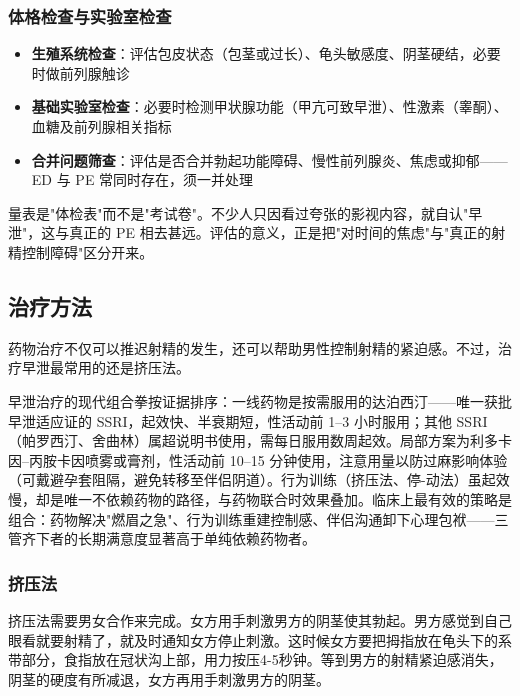 \subsubsection{体格检查与实验室检查}

\begin{itemize}
	\item \textbf{生殖系统检查}：评估包皮状态（包茎或过长）、龟头敏感度、阴茎硬结，必要时做前列腺触诊
	\item \textbf{基础实验室检查}：必要时检测甲状腺功能（甲亢可致早泄）、性激素（睾酮）、血糖及前列腺相关指标
	\item \textbf{合并问题筛查}：评估是否合并勃起功能障碍、慢性前列腺炎、焦虑或抑郁——ED 与 PE 常同时存在，须一并处理
\end{itemize}

\begin{tcolorbox}[colback=pink!5!white,colframe=red!50!black,title=贴心小叮咛]
量表是"体检表"而不是"考试卷"。不少人只因看过夸张的影视内容，就自认"早泄"，这与真正的 PE 相去甚远。评估的意义，正是把"对时间的焦虑"与"真正的射精控制障碍"区分开来。
\end{tcolorbox}

\subsection{治疗方法}

药物治疗不仅可以推迟射精的发生，还可以帮助男性控制射精的紧迫感。不过，治疗早泄最常用的还是挤压法。


早泄治疗的现代组合拳按证据排序：一线药物是按需服用的达泊西汀——唯一获批早泄适应证的 SSRI，起效快、半衰期短，性活动前 1--3 小时服用；其他 SSRI（帕罗西汀、舍曲林）属超说明书使用，需每日服用数周起效。局部方案为利多卡因--丙胺卡因喷雾或膏剂，性活动前 10--15 分钟使用，注意用量以防过麻影响体验（可戴避孕套阻隔，避免转移至伴侣阴道）。行为训练（挤压法、停-动法）虽起效慢，却是唯一不依赖药物的路径，与药物联合时效果叠加。临床上最有效的策略是组合：药物解决"燃眉之急"、行为训练重建控制感、伴侣沟通卸下心理包袱——三管齐下者的长期满意度显著高于单纯依赖药物者。

\subsubsection{挤压法}

挤压法需要男女合作来完成。女方用手刺激男方的阴茎使其勃起。男方感觉到自己眼看就要射精了，就及时通知女方停止刺激。这时候女方要把拇指放在龟头下的系带部分，食指放在冠状沟上部，用力按压4-5秒钟。等到男方的射精紧迫感消失，阴茎的硬度有所减退，女方再用手刺激男方的阴茎。

